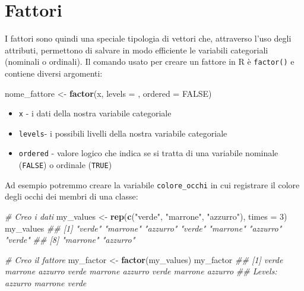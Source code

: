 \documentclass[
]{book}
\newenvironment{Shaded}{\begin{snugshade}}{\end{snugshade}}
\newcommand{\CommentTok}[1]{\textcolor[rgb]{0.56,0.35,0.01}{\textit{#1}}}
\newcommand{\DataTypeTok}[1]{\textcolor[rgb]{0.13,0.29,0.53}{#1}}
\newcommand{\DecValTok}[1]{\textcolor[rgb]{0.00,0.00,0.81}{#1}}
\newcommand{\KeywordTok}[1]{\textcolor[rgb]{0.13,0.29,0.53}{\textbf{#1}}}
\newcommand{\NormalTok}[1]{#1}
\newcommand{\OtherTok}[1]{\textcolor[rgb]{0.56,0.35,0.01}{#1}}
\newcommand{\StringTok}[1]{\textcolor[rgb]{0.31,0.60,0.02}{#1}}
\providecommand{\tightlist}{%
  \setlength{\itemsep}{0pt}\setlength{\parskip}{0pt}}
\begin{document}
\hypertarget{fattori}{%
\section{Fattori}\label{fattori}}

I fattori sono quindi una speciale tipologia di vettori che, attraverso l'uso degli attributi, permettono di salvare in modo efficiente le variabili categoriali (nominali o ordinali). Il comando usato per creare un fattore in R è \texttt{factor()} e contiene diversi argomenti:

\begin{Shaded}
\begin{Highlighting}[]
\NormalTok{nome_fattore <-}\StringTok{ }\KeywordTok{factor}\NormalTok{(x, }\DataTypeTok{levels =}\NormalTok{ , }\DataTypeTok{ordered =} \OtherTok{FALSE}\NormalTok{)}
\end{Highlighting}
\end{Shaded}

\begin{itemize}
\tightlist
\item
  \texttt{x} - i dati della nostra variabile categoriale
\item
  \texttt{levels}- i possibili livelli della nostra variabile categoriale
\item
  \texttt{ordered} - valore logico che indica se si tratta di una variabile nominale (\texttt{FALSE}) o ordinale (\texttt{TRUE})
\end{itemize}

Ad esempio potremmo creare la variabile \texttt{colore\_occhi} in cui registrare il colore degli occhi dei membri di una classe:

\begin{Shaded}
\begin{Highlighting}[]
\CommentTok{# Creo i dati}
\NormalTok{my_values <-}\StringTok{ }\KeywordTok{rep}\NormalTok{(}\KeywordTok{c}\NormalTok{(}\StringTok{"verde"}\NormalTok{, }\StringTok{"marrone"}\NormalTok{, }\StringTok{"azzurro"}\NormalTok{), }\DataTypeTok{times =} \DecValTok{3}\NormalTok{)}
\NormalTok{my_values}
\CommentTok{## [1] "verde"   "marrone" "azzurro" "verde"   "marrone" "azzurro" "verde"  }
\CommentTok{## [8] "marrone" "azzurro"}

\CommentTok{# Creo il fattore}
\NormalTok{my_factor <-}\StringTok{ }\KeywordTok{factor}\NormalTok{(my_values)}
\NormalTok{my_factor}
\CommentTok{## [1] verde   marrone azzurro verde   marrone azzurro verde   marrone azzurro}
\CommentTok{## Levels: azzurro marrone verde}
\end{Highlighting}
\end{Shaded}
\end{document}
